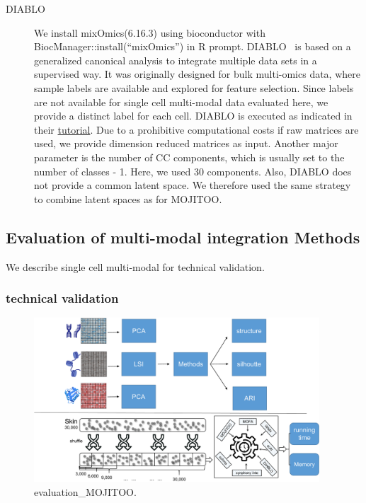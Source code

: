 \begin{description}
\item[DIABLO]
We install mixOmics(6.16.3) using bioconductor with BiocManager::install(``mixOmics'') in R prompt.
DIABLO~\cite{singh2019diablo} is based on a generalized canonical analysis to integrate multiple data sets in a supervised way. It was originally designed for bulk multi-omics data, where sample labels are available and explored for feature selection. Since labels are not available for single cell multi-modal data evaluated here, we provide a distinct label for each cell. DIABLO is executed as indicated in their \href{http://mixomics.org/mixdiablo/}{tutorial}. Due to a prohibitive computational costs if raw matrices are used, we provide dimension reduced matrices as input.  Another major parameter is the number of CC components, which is usually set to the number of classes - 1. Here, we used 30 components. Also, DIABLO does not provide a common latent space. We therefore used the same strategy to combine latent spaces as for MOJITOO. 
\end{description}


\subsection{Evaluation of multi-modal integration Methods}
We describe single cell multi-modal for technical validation.

\subsubsection{technical validation}

\begin{figure}[!ht]
	\centering
	\includegraphics[width=0.95\textwidth]{evaluation_MOJITOO/fig}
	\vspace{0.1cm}
	\caption[evaluation\_MOJITOO]{
	evaluation\_MOJITOO.}
	\label{fig:evaluation_MOJITOO}
\end{figure}

